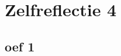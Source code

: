 \documentclass[lineaire_algebra_oplossingen.tex]{subfiles}
\begin{document}
\section{Zelfreflectie 4}

\subsection{oef 1}
\end{document}
